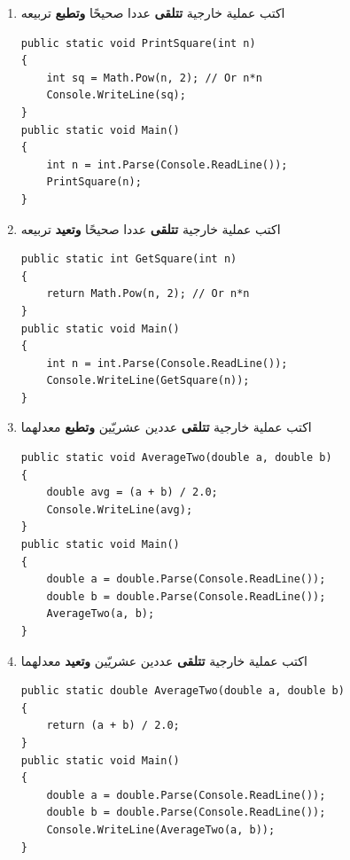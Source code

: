 ﻿\documentclass[12pt]{article}
\begin{document}
\begin{enumerate}[itemsep=3em]
\begin{enumerate}
\item اكتب عملية خارجية \textbf{تتلقى} عددا صحيحًا \textbf{وتطبع} تربيعه
\ifwithsols
\begin{boxSolution}
\begin{english}
\begin{verbatim}
public static void PrintSquare(int n)
{
    int sq = Math.Pow(n, 2); // Or n*n
    Console.WriteLine(sq);
}
public static void Main()
{
    int n = int.Parse(Console.ReadLine());
    PrintSquare(n);
}
\end{verbatim}
\end{english}
\end{boxSolution}
\clearpage
\fi


\item اكتب عملية خارجية \textbf{تتلقى} عددا صحيحًا \textbf{وتعيد} تربيعه
\ifwithsols
\begin{boxSolution}
\begin{english}
\begin{verbatim}
public static int GetSquare(int n)
{
    return Math.Pow(n, 2); // Or n*n
}
public static void Main()
{
    int n = int.Parse(Console.ReadLine());
    Console.WriteLine(GetSquare(n));
}
\end{verbatim}
\end{english}
\end{boxSolution}
\fi

\item اكتب عملية خارجية \textbf{تتلقى} عددين عشريّين \textbf{وتطبع} معدلهما
\ifwithsols
\begin{boxSolution}
\begin{english}
\begin{verbatim}
public static void AverageTwo(double a, double b)
{
    double avg = (a + b) / 2.0;
    Console.WriteLine(avg);
}
public static void Main()
{
    double a = double.Parse(Console.ReadLine());
    double b = double.Parse(Console.ReadLine());
    AverageTwo(a, b);
}
\end{verbatim}
\end{english}
\end{boxSolution}
\clearpage
\fi

\item اكتب عملية خارجية \textbf{تتلقى} عددين عشريّين \textbf{وتعيد} معدلهما
\ifwithsols
\begin{boxSolution}
\begin{english}
\begin{verbatim}
public static double AverageTwo(double a, double b)
{
    return (a + b) / 2.0;
}
public static void Main()
{
    double a = double.Parse(Console.ReadLine());
    double b = double.Parse(Console.ReadLine());
    Console.WriteLine(AverageTwo(a, b));
}
\end{verbatim}
\end{english}
\end{boxSolution}
\clearpage
\fi


\end{enumerate}
\end{enumerate}
\end{document}
